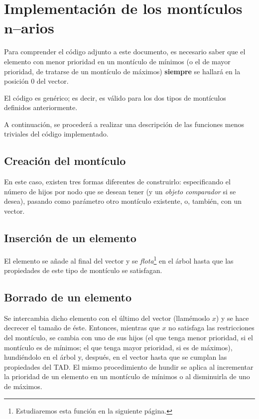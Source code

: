 \chapter{Implementación de los montículos $\boldsymbol{n}$--arios}
Para comprender el código adjunto a este documento, es necesario saber que el elemento con menor prioridad en un montículo de mínimos (o el de mayor prioridad, de tratarse de un montículo de máximos) \textbf{siempre} se hallará en la posición $0$ del vector.
\newline

El código es genérico; es decir, es válido para los dos tipos de montículos definidos anteriormente.
\newline

A continuación, se procederá a realizar una descripción de las funciones menos triviales del código implementado.

\section{Creación del montículo}
En este caso, existen tres formas diferentes de construirlo: especificando el número de hijos por nodo que se desean tener (y un \textit{objeto comparador} si se desea), pasando como parámetro otro montículo existente, o, también, con un vector. 

\section{Inserción de un elemento}
El elemento se añade al final del vector y se \textit{flota}\footnote{Estudiaremos esta función en la siguiente página.} en el árbol hasta que las propiedades de este tipo de montículo se satisfagan.
\newpage
\section{Borrado de un elemento}
Se intercambia dicho elemento con el último del vector (llamémoslo $x$) y se hace decrecer el tamaño de éste. Entonces, mientras que $x$ no satisfaga las restricciones del montículo, se cambia con uno de sus hijos (el que tenga menor prioridad, si el montículo es de mínimos; el que tenga mayor prioridad, si es de máximos), hundiéndolo en el árbol y, después, en el vector hasta que se cumplan las propiedades del TAD. El mismo procedimiento de hundir se aplica al incrementar la prioridad de un elemento en un montículo de mínimos o al disminuirla de uno de máximos.

